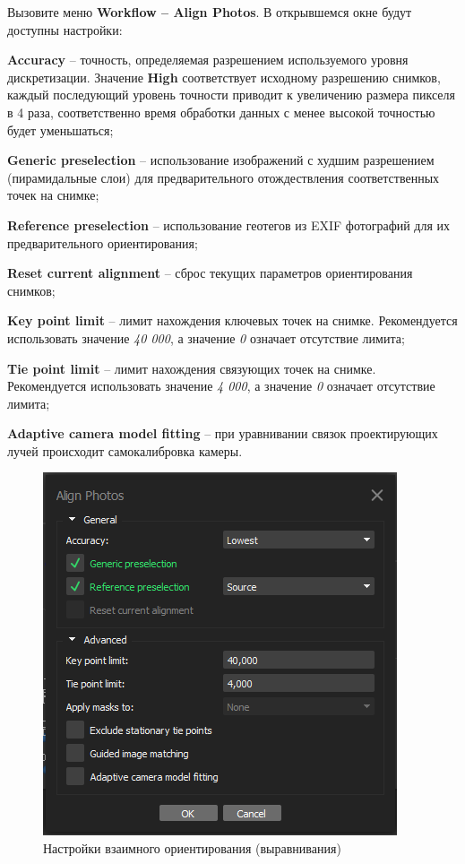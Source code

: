 \documentclass[
  12pt,
]{book}
\begin{document}
Вызовите меню \textbf{Workflow -- Align Photos}. В открывшемся окне будут доступны настройки:

\textbf{Accuracy} -- точность, определяемая разрешением используемого уровня дискретизации. Значение \textbf{High} соответствует исходному разрешению снимков, каждый последующий уровень точности приводит к увеличению размера пикселя в 4 раза, соответственно время обработки данных с менее высокой точностью будет уменьшаться;

\textbf{Generic preselection} -- использование изображений с худшим разрешением (пирамидальные слои) для предварительного отождествления соответственных точек на снимке;

\textbf{Reference preselection} -- использование геотегов из EXIF фотографий для их предварительного ориентирования;

\textbf{Reset current alignment} -- сброс текущих параметров ориентирования снимков;

\textbf{Key point limit} -- лимит нахождения ключевых точек на снимке. Рекомендуется использовать значение \emph{40 000}, а значение \emph{0} означает отсутствие лимита;

\textbf{Tie point limit} -- лимит нахождения связующих точек на снимке. Рекомендуется использовать значение \emph{4 000}, а значение \emph{0} означает отсутствие лимита;

\textbf{Adaptive camera model fitting} -- при уравнивании связок проектирующих лучей происходит самокалибровка камеры.

\begin{figure}
\centering
\includegraphics{images/Ref18/Align_Photos.png}
\caption{Настройки взаимного ориентирования (выравнивания)}
\end{figure}
\end{document}
